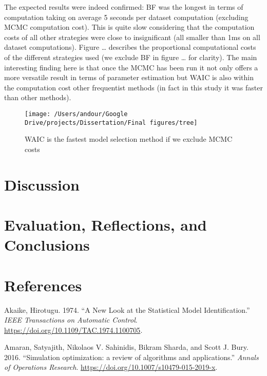 \documentclass[]{article}
\begin{document}
The expected results were indeed confirmed: BF was the longest in terms
of computation taking on average 5 seconds per dataset computation
(excluding MCMC computation cost). This is quite slow considering that
the computation costs of all other strategies were close to
insignificant (all smaller than 1ms on all dataset computations). Figure
\ldots{} describes the proportional computational costs of the different
strategies used (we exclude BF in figure \ldots{} for clarity). The main
interesting finding here is that once the MCMC has been run it not only
offers a more versatile result in terms of parameter estimation but WAIC
is also within the computation cost other frequentist methods (in fact
in this study it was faster than other methods).

\begin{figure}

{\centering \texttt{[image: /Users/andour/Google Drive/projects/Dissertation/Final figures/tree]} 

}

\caption{WAIC is the fastest model selection method if we exclude MCMC costs}\label{fig:unnamed-chunk-7}
\end{figure}

\hypertarget{discussion}{%
\section{Discussion}\label{discussion}}

\hypertarget{evaluation-reflections-and-conclusions}{%
\section{Evaluation, Reflections, and
Conclusions}\label{evaluation-reflections-and-conclusions}}

\newpage

\hypertarget{references}{%
\section*{References}\label{references}}

\hypertarget{refs}{}
\leavevmode\hypertarget{ref-Akaike1974}{}%
Akaike, Hirotugu. 1974. ``A New Look at the Statistical Model
Identification.'' \emph{IEEE Transactions on Automatic Control}.
\url{https://doi.org/10.1109/TAC.1974.1100705}.

\leavevmode\hypertarget{ref-Amaran2016}{}%
Amaran, Satyajith, Nikolaos V. Sahinidis, Bikram Sharda, and Scott J.
Bury. 2016. ``Simulation optimization: a review of algorithms and
applications.'' \emph{Annals of Operations Research}.
\url{https://doi.org/10.1007/s10479-015-2019-x}.
\end{document}
